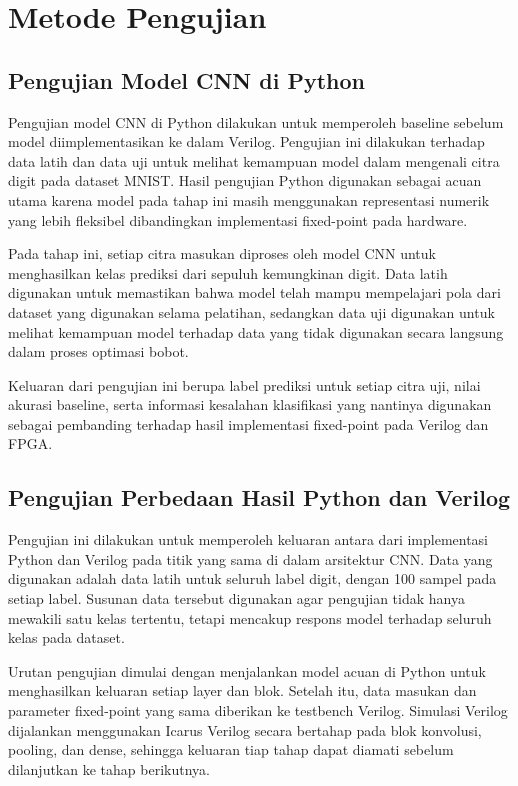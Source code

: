 \section{Metode Pengujian}
    \subsection{Pengujian Model CNN di Python}
	Pengujian model CNN di Python dilakukan untuk memperoleh baseline sebelum
	model diimplementasikan ke dalam Verilog. Pengujian ini dilakukan terhadap data
	latih dan data uji untuk melihat kemampuan model dalam mengenali citra digit
	pada dataset MNIST. Hasil pengujian Python digunakan sebagai acuan utama karena
	model pada tahap ini masih menggunakan representasi numerik yang lebih fleksibel
	dibandingkan implementasi fixed-point pada hardware.

	Pada tahap ini, setiap citra masukan diproses oleh model CNN untuk menghasilkan
	kelas prediksi dari sepuluh kemungkinan digit. Data latih digunakan untuk
	memastikan bahwa model telah mampu mempelajari pola dari dataset yang digunakan
	selama pelatihan, sedangkan data uji digunakan untuk melihat kemampuan model
	terhadap data yang tidak digunakan secara langsung dalam proses optimasi bobot.

	Keluaran dari pengujian ini berupa label prediksi untuk setiap citra uji,
	nilai akurasi baseline, serta informasi kesalahan klasifikasi yang nantinya
	digunakan sebagai pembanding terhadap hasil implementasi fixed-point pada
	Verilog dan FPGA.
	\subsection{Pengujian Perbedaan Hasil Python dan Verilog}
	Pengujian ini dilakukan untuk memperoleh keluaran antara dari implementasi
	Python dan Verilog pada titik yang sama di dalam arsitektur CNN. Data yang
	digunakan adalah data latih untuk seluruh label digit, dengan 100 sampel pada
	setiap label. Susunan data tersebut digunakan agar pengujian tidak hanya
	mewakili satu kelas tertentu, tetapi mencakup respons model terhadap seluruh
	kelas pada dataset.

	Urutan pengujian dimulai dengan menjalankan model acuan di Python untuk
	menghasilkan keluaran setiap layer dan blok. Setelah itu, data masukan dan
	parameter fixed-point yang sama diberikan ke testbench Verilog. Simulasi
	Verilog dijalankan menggunakan Icarus Verilog secara bertahap pada blok
	konvolusi, pooling, dan dense, sehingga keluaran tiap tahap dapat diamati
	sebelum dilanjutkan ke tahap berikutnya.

